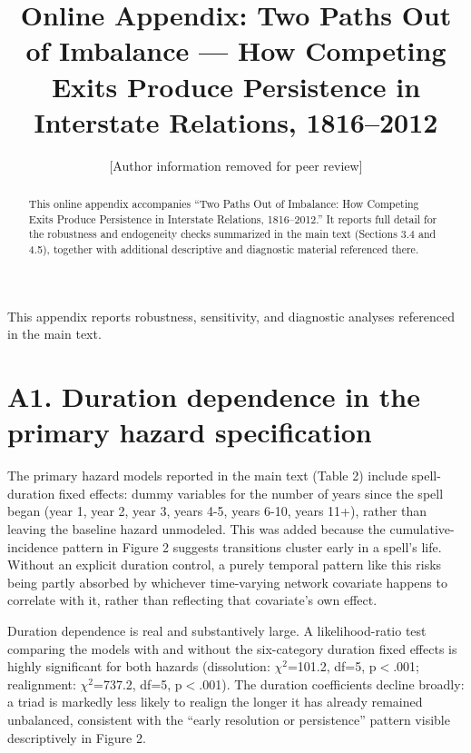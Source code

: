 \documentclass[Afour,sageh,times,doublespace]{sagej}
\begin{document}

\title{Online Appendix: Two Paths Out of Imbalance --- How Competing Exits Produce Persistence in Interstate Relations, 1816--2012}

\author{[Author information removed for peer review]}

\begin{abstract}
This online appendix accompanies ``Two Paths Out of Imbalance: How Competing Exits Produce Persistence in Interstate Relations, 1816--2012.'' It reports full detail for the robustness and endogeneity checks summarized in the main text (Sections 3.4 and 4.5), together with additional descriptive and diagnostic material referenced there.
\end{abstract}

\maketitle

This appendix reports robustness, sensitivity, and diagnostic analyses referenced in the main text.

\section*{A1. Duration dependence in the primary hazard specification}

The primary hazard models reported in the main text (Table 2) include spell-duration fixed effects: dummy variables for the number of years since the spell began (year 1, year 2, year 3, years 4-5, years 6-10, years 11+), rather than leaving the baseline hazard unmodeled. This was added because the cumulative-incidence pattern in Figure 2 suggests transitions cluster early in a spell's life. Without an explicit duration control, a purely temporal pattern like this risks being partly absorbed by whichever time-varying network covariate happens to correlate with it, rather than reflecting that covariate's own effect.

Duration dependence is real and substantively large. A likelihood-ratio test comparing the models with and without the six-category duration fixed effects is highly significant for both hazards (dissolution: $\chi^2$=101.2, df=5, p$<$.001; realignment: $\chi^2$=737.2, df=5, p$<$.001). The duration coefficients decline broadly: a triad is markedly less likely to realign the longer it has already remained unbalanced, consistent with the ``early resolution or persistence'' pattern visible descriptively in Figure 2.
\end{document}
